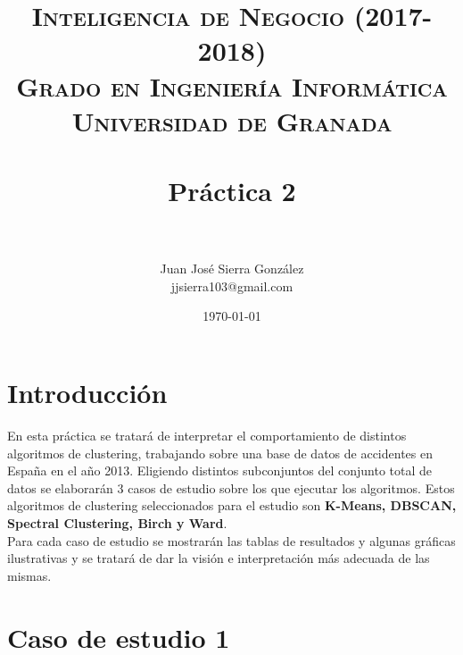 

\title{	
	\normalfont \normalsize 
	\textsc{\textbf{Inteligencia de Negocio (2017-2018)} \\ Grado en Ingeniería Informática \\ Universidad de Granada} \\ [25pt] 
	\horrule{0.5pt} \\[0.4cm]
	\huge Práctica 2 \\
	\horrule{2pt} \\[0.5cm]
}

\author{Juan José Sierra González \\ jjsierra103@gmail.com}

\date{\normalsize\today}


	\maketitle
	\thispagestyle{empty}
	
	\newpage
	
	\tableofcontents
	
	\listoffigures
	
	\listoftables
	
	\newpage
	
	\section{Introducción}
	En esta práctica se tratará de interpretar el comportamiento de distintos algoritmos de clustering, trabajando sobre una base de datos de accidentes en España en el año 2013. Eligiendo distintos subconjuntos del conjunto total de datos se elaborarán 3 casos de estudio sobre los que ejecutar los algoritmos. Estos algoritmos de clustering seleccionados para el estudio son \textbf{K-Means, DBSCAN, Spectral Clustering, Birch y Ward}.\\
	
	Para cada caso de estudio se mostrarán las tablas de resultados y algunas gráficas ilustrativas y se tratará de dar la visión e interpretación más adecuada de las mismas.
	
	\section{Caso de estudio 1}
	
